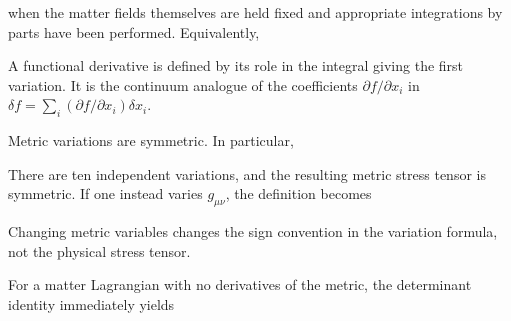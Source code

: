 \documentclass[
  11pt,
  letterpaper,
  oneside,
  openany]{scrbook}
\begin{document}
when the matter fields themselves are held fixed and appropriate
integrations by parts have been performed. Equivalently,

\begin{center}
\begingroup
{}
\ifdim\wd\grmathbox>\linewidth
\resizebox{\linewidth}{!}{\usebox{\grmathbox}}
\else\usebox{\grmathbox}\fi
\endgroup
\end{center}

A functional derivative is defined by its role in the integral giving
the first variation. It is the continuum analogue of the coefficients
\(\partial f/\partial x_i\) in
\(\delta f=\sum_i(\partial f/\partial x_i)\delta x_i\).

Metric variations are symmetric. In particular,

\begin{center}
\begingroup
{}
\ifdim\wd\grmathbox>\linewidth
\resizebox{\linewidth}{!}{\usebox{\grmathbox}}
\else\usebox{\grmathbox}\fi
\endgroup
\end{center}

There are ten independent variations, and the resulting metric stress
tensor is symmetric. If one instead varies \(g_{\mu\nu}\), the
definition becomes

\begin{center}
\begingroup
{}
\ifdim\wd\grmathbox>\linewidth
\resizebox{\linewidth}{!}{\usebox{\grmathbox}}
\else\usebox{\grmathbox}\fi
\endgroup
\end{center}

Changing metric variables changes the sign convention in the variation
formula, not the physical stress tensor.

For a matter Lagrangian with no derivatives of the metric, the
determinant identity immediately yields

\begin{center}
\begingroup
{}
\ifdim\wd\grmathbox>\linewidth
\resizebox{\linewidth}{!}{\usebox{\grmathbox}}
\else\usebox{\grmathbox}\fi
\endgroup
\end{center}
\end{document}
